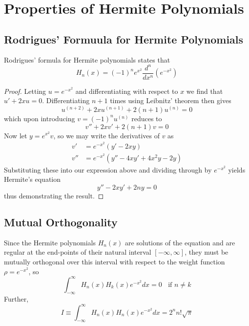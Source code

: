 \documentclass[12pt, a4paper, oneside, openright, titlepage]{book}
\begin{document}
\section{Properties of Hermite Polynomials}

\subsection{Rodrigues' Formuula for Hermite Polynomials}

\begin{namthm}
    Rodrigues' formula for Hermite polynomials states that \begin{equation*}
        H_n(x) = (-1)^ne^{x^2}\frac{d^n}{dx^n}(e^{-x^2})
    \end{equation*}
\end{namthm}
\begin{proof}
    Letting $u = e^{-x^2}$ and differentiating with respect to $x$ we find that $u' + 2xu = 0$. Differentiating $n+1$ times using Leibnitz' theorem then gives \begin{equation*}
        u^{(n+2)} + 2xu^{(n+1)} + 2(n+1)u^{(n)} = 0
    \end{equation*}
    which upon introducing $v = (-1)^nu^{(n)}$ reduces to $$v'' + 2xv' + 2(n+1)v = 0$$ Now let $y = e^{x^2}v$, so we may write the derivatives of $v$ as \begin{align*}
        v' &= e^{-x^2}(y' - 2xy) \\
        v'' &= e^{-x^2}(y'' - 4xy' + 4x^2y - 2y)
    \end{align*}
    Substituting these into our expression above and dividing through by $e^{-x^2}$ yields Hermite's equation \begin{equation*}
        y'' - 2xy' + 2ny = 0
    \end{equation*}
    thus demonstrating the result.
\end{proof}


\subsection{Mutual Orthogonality}

Since the Hermite polynomials $H_n(x)$ are solutions of the equation and are regular at the end-points of their natural interval $[-\infty,\infty]$, they must be mutually orthogonal over this interval with respect to the weight function $\rho = e^{-x^2}$, so \begin{equation*}
    \int_{-\infty}^{\infty}H_n(x)H_k(x)e^{-x^2}dx = 0\;\;\text{ if } n\neq k
\end{equation*}
Further, \begin{equation*}
    I \equiv \int_{-\infty}^{\infty}H_n(x)H_n(x)e^{-x^2}dx = 2^nn!\sqrt{\pi}
\end{equation*}
\end{document}
